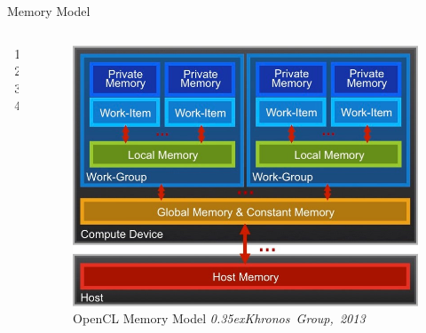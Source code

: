 \documentclass[10pt,aspectratio=169]{beamer} %
\begin{document}
\begin{frame}{Memory Model}
\begin{columns}[c]
\begin{column}{0.48\textwidth}
\begin{enumerate}
\item[]  \makebox[2em][r]{$\longrightarrow$}  
\item[]  \makebox[2em][r]{$\longrightarrow$}  
\item[]  \makebox[2em][r]{$\longrightarrow$}  
\item[]  \makebox[2em][r]{$\longrightarrow$}  
\end{enumerate}
\end{column}
\begin{column}{0.52\textwidth}
\begin{figure}
    \includegraphics[width=\textwidth]{OpenCLMemModel.jpg}
    \caption{OpenCL Memory Model \emph{\textcopyright \scriptsize\raise0.35ex\hbox{Khronos Group, 2013}}}
\end{figure}
\end{column}
\end{columns}
\end{frame}
\end{document}
